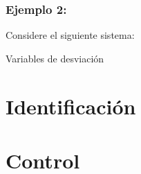 \documentclass[a4paper,12pt,twoside]{proyectotanquesecci}
\begin{document}
\subsubsection{Ejemplo 2:}

Considere el siguiente sistema:

Variables de desviación







\newpage




\section{Identificación}


\newpage




\section{Control}


\newpage





\end{document}
